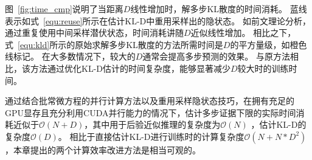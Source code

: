 图~\ref{fig:time_cmp}说明了当距离$D$线性增加时，解多步KL散度的时间消耗。
蓝线表示如式~\eqref{equ:reuse}所示在估计KL-D中重用采样出的隐状态。
如前文理论分析，通过重复使用中间采样潜伏状态，时间消耗讲随$D$近似线性增加。
相比之下，式~\eqref{equ:kld}所示的原始求解多步KL散度的方法所需时间是$D$的平方量级，如橙色线标记。
在大多数情况下，较大的$D$通常会提高多步预测的效果。
与原方法相比，该方法通过优化KL-D估计的时间复杂度，能够显著减少$D$较大时的训练时间。

通过结合批常微方程的并行计算方法以及重用采样隐状态技巧，在拥有充足的GPU显存且充分利用CUDA并行能力的情况下，估计多步证据下限的实际时间消耗近似于$\mathcal{O}(N+D)$，其中用于后验近似推理的复杂度为$\mathcal{O}(N)$ ，估计KL-D的复杂度$\mathcal{O}(D)$。
相比于直接估计KL-D进行训练时的计算复杂度$\mathcal{O}(N+N*D^2)$
，本章提出的两个计算效率改进方法是相当可观的。

